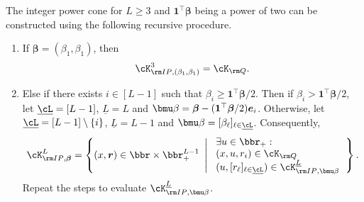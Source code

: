 \documentclass[opre, blindrev]{informs4}
\newcommand{\1}[1]{\mathds{1}{\left(#1\right)}}
\begin{document}
\begin{appendices}
\begin{theorem}
\label{thm:IntegerPowerConvert}
The integer power cone for $L\geq 3$ and $\bm 1^\top \bm \beta$ being a power of two can be constructed using the following recursive procedure.
\begin{enumerate}[Step 1.]

\item If  $\bm \beta = (\beta_1, \beta_1)$, then
$$
\cK^{3}_{{\rm IP},(\beta_1,\beta_1)} =   \cK_{
\rm Q}.  
$$

\item Else if there exists $i \in [L-1]$ such that $\beta_i \geq \bm 1^\top \bm \beta/2$. Then if $\beta_i >  \bm 1^\top \bm \beta/2$, let $\underline \cL = [L-1]$, $\underline L = L$ and $\bmu \beta =\bm \beta - (\bm 1^\top \bm \beta/2)\bm e_i$. Otherwise, let $\underline \cL = [L-1]\setminus\{i\}$, $\underline L = L-1$ and  $\bmu \beta = [\beta_\ell]_{\ell \in \underline \cL}$. Consequently, 
$$
\cK^{L}_{{\rm IP},\bm \beta} = \left\{ (x,\bm r) \in \bbr\times \bbr^{L-1}_+ ~\left|~ 
\begin{array}{ll} \exists u \in \bbr_+: \\
(x,u,r_i) \in \cK_{{\rm Q}} \\
(u, [r_\ell]_{\ell \in \underline \cL}) \in \cK^{\underline L}_{{\rm IP},\bmu \beta} \\
\end{array}
\right.\right\}.
$$
Repeat the steps to evaluate $\cK^{\underline L}_{{\rm IP},\bmu \beta}$.


\end{enumerate}
\end{theorem}
\end{appendices}
\end{document}
